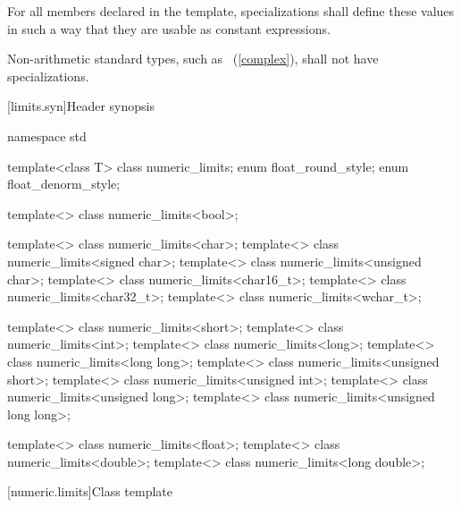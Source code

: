 \pnum
For all members declared
 
in the
template, specializations shall define these values in such a way
that they are usable as
constant expressions.

\pnum
Non-arithmetic standard types, such as
~(\ref{complex}), shall not have specializations.

%
%
%
%
%
%
[limits.syn]{Header  synopsis}

\begin{codeblock}
namespace std {
  template<class T> class numeric_limits;
  enum float_round_style;
  enum float_denorm_style;

  template<> class numeric_limits<bool>;

  template<> class numeric_limits<char>;
  template<> class numeric_limits<signed char>;
  template<> class numeric_limits<unsigned char>;
  template<> class numeric_limits<char16_t>;
  template<> class numeric_limits<char32_t>;
  template<> class numeric_limits<wchar_t>;

  template<> class numeric_limits<short>;
  template<> class numeric_limits<int>;
  template<> class numeric_limits<long>;
  template<> class numeric_limits<long long>;
  template<> class numeric_limits<unsigned short>;
  template<> class numeric_limits<unsigned int>;
  template<> class numeric_limits<unsigned long>;
  template<> class numeric_limits<unsigned long long>;

  template<> class numeric_limits<float>;
  template<> class numeric_limits<double>;
  template<> class numeric_limits<long double>;
}
\end{codeblock}

[numeric.limits]{Class template }

